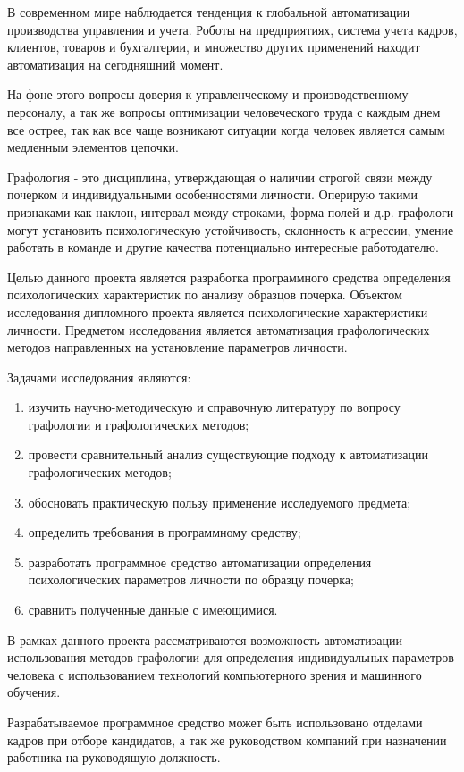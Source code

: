 \label{sec:intro}

В современном мире наблюдается тенденция к глобальной автоматизации производства управления и учета. Роботы на предприятиях, система учета кадров, клиентов, товаров и бухгалтерии, и множество других применений находит автоматизация на сегодняшний момент.

На фоне этого вопросы доверия к управленческому и производственному персоналу, а так же вопросы оптимизации человеческого труда с каждым днем все острее, так как все чаще возникают ситуации когда человек
является самым медленным элементов цепочки.

Графология - это дисциплина, утверждающая о наличии строгой связи между почерком и индивидуальными особенностями личности. Оперирую такими признаками как наклон, интервал между строками, форма полей и д.р. графологи могут установить психологическую устойчивость, склонность к агрессии, умение работать в команде и другие качества потенциально интересные работодателю.

Целью данного проекта является разработка программного средства определения психологических характеристик по анализу образцов почерка.  
Объектом исследования дипломного проекта является психологические характеристики личности.
Предметом исследования является автоматизация графологических методов направленных на установление параметров личности.

Задачами исследования являются:
\begin{enumerate}
  \item изучить научно-методическую и справочную литературу по вопросу графологии и графологических методов;
  \item провести сравнительный анализ существующие подходу к автоматизации графологических методов;
  \item обосновать практическую пользу применение исследуемого предмета;
  \item определить требования в программному средству;
  \item разработать программное средство автоматизации определения психологических параметров личности по образцу почерка;
  \item сравнить полученные данные с имеющимися.
\end{enumerate}

В рамках данного проекта рассматриваются возможность автоматизации использования методов графологии для определения индивидуальных параметров человека с использованием технологий компьютерного зрения и машинного обучения.

Разрабатываемое программное средство может быть использовано отделами кадров при отборе кандидатов, а так же руководством компаний при назначении работника на руководящую должность.